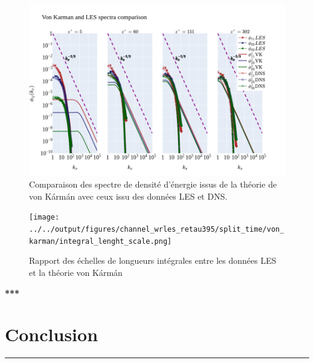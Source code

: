 \documentclass[12pt]{article}
\theoremstyle{plain}
\theoremstyle{remark}
\begin{document}
\begin{figure}[h!]
	\begin{center}
		\includegraphics[width=0.9\linewidth]{../../output/figures/channel_wrles_retau395/split_time/von_karman/von_karman_spectra.png}
		\caption{Comparaison des spectre de densité d'énergie issus de la théorie de von Kármán avec ceux issu des données LES et DNS.}
		\label{fig:vk_spectra}
	\end{center}
\end{figure}
\pagebreak

\begin{figure}[h!]
	\begin{center}
		\texttt{[image: ../../output/figures/channel\_wrles\_retau395/split\_time/von\_karman/integral\_lenght\_scale.png]}
		\caption{Rapport des échelles de longueurs intégrales entre les données LES et la théorie von Kármán}
		\label{fig:vk_integral_scale}
	\end{center}
\end{figure}
	


\begin{center}
	\large \bf{***}
\end{center}

\vspace{0.3cm}
\section{Conclusion}
\noindent\rule{\linewidth}{2pt}
\vspace{0.1cm}
\end{document}
